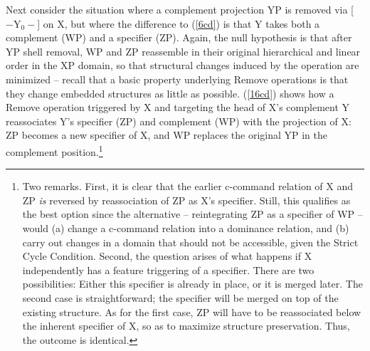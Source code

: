 \documentclass[output=paper]{langsci/langscibook}
\begin{document}
\noindent Next consider the situation where a complement projection YP is
removed via [$-\text{Y}_0-$] on X, but where the difference to (\ref{6cd}) is
that Y takes both a complement (WP) and a specifier (ZP).  Again, the null
hypothesis is that after YP shell removal,  WP and ZP reassemble in their
original hierarchical and linear order in the XP domain, so that structural
changes induced by the operation are minimized -- recall that a basic property
underlying Remove operations is that they change embedded structures as little
as possible. (\ref{16cd}) shows how a Remove operation triggered by X and
targeting the head of X's complement Y reassociates Y's specifier (ZP) and
complement (WP) with the projection of X: ZP becomes a new specifier of X, and
WP replaces the original YP in the complement
position.\footnote{\label{spr7s}Two remarks.  First, it is clear that the
    earlier c-command relation of X and ZP {\itshape is} reversed by reassociation
    of ZP as X's specifier. Still, this qualifies as the best option since the
    alternative -- reintegrating ZP as a specifier of WP -- would (a) change a
    c-command relation into a dominance relation, and (b) carry out changes in
    a domain that should not be accessible, given the Strict Cycle Condition.
    Second, the question arises of what happens if X independently has a
    feature triggering  of a specifier. There are two possibilities:
    Either this specifier is already in place, or it is merged later. The
    second case is straightforward; the specifier will be merged on top of the
    existing structure. As for the first case, ZP will have to be
    reassociated below the inherent specifier of X, so as to maximize structure
preservation. Thus, the outcome is identical.}
\end{document}
